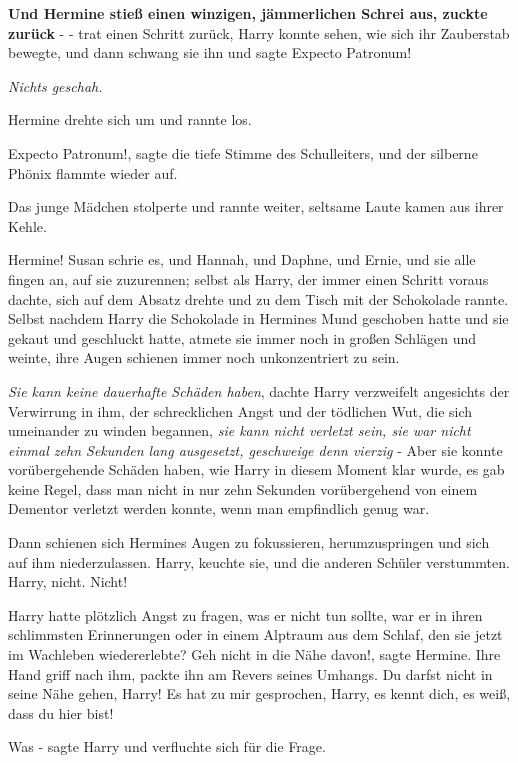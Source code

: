\textbf{ Und Hermine stieß einen winzigen, jämmerlichen Schrei aus, zuckte
zurück} - - trat einen Schritt zurück, Harry konnte sehen, wie sich ihr
Zauberstab bewegte, und dann schwang sie ihn und sagte \glqq{}Expecto Patronum!\grqq{}

\emph{Nichts geschah.}

Hermine drehte sich um und rannte los.

\glqq{}Expecto Patronum!\grqq{}, sagte die tiefe Stimme des Schulleiters, und der
silberne Phönix flammte wieder auf.

Das junge Mädchen stolperte und rannte weiter, seltsame Laute kamen aus ihrer
Kehle.

\glqq{}Hermine!\grqq{} Susan schrie es, und Hannah, und Daphne, und Ernie, und
sie alle fingen an, auf sie zuzurennen; selbst als Harry, der immer einen
Schritt voraus dachte, sich auf dem Absatz drehte und zu dem Tisch mit der
Schokolade rannte. Selbst nachdem Harry die Schokolade in Hermines Mund
geschoben hatte und sie gekaut und geschluckt hatte, atmete sie immer noch in
großen Schlägen und weinte, ihre Augen schienen immer noch unkonzentriert zu
sein.

\emph{Sie kann keine dauerhafte Schäden haben}, dachte Harry verzweifelt
angesichts der Verwirrung in ihm, der schrecklichen Angst und der tödlichen Wut,
die sich umeinander zu winden begannen,\emph{ sie kann nicht verletzt sein, sie
war nicht einmal zehn Sekunden lang ausgesetzt, geschweige denn vierzig} - Aber
sie konnte vorübergehende Schäden haben, wie Harry in diesem Moment klar wurde,
es gab keine Regel, dass man nicht in nur zehn Sekunden vorübergehend von einem
Dementor verletzt werden konnte, wenn man empfindlich genug war.

Dann schienen sich Hermines Augen zu fokussieren, herumzuspringen und sich auf
ihm niederzulassen. \glqq{}Harry\grqq{}, keuchte sie, und die anderen Schüler
verstummten. \glqq{}Harry, nicht. Nicht!\grqq{}

Harry hatte plötzlich Angst zu fragen, was er nicht tun sollte, war er in ihren
schlimmsten Erinnerungen oder in einem Alptraum aus dem Schlaf, den sie jetzt im
Wachleben wiedererlebte? \glqq{}Geh nicht in die Nähe davon!\grqq{}, sagte
Hermine. Ihre Hand griff nach ihm, packte ihn am Revers seines Umhangs. \glqq{}Du
darfst nicht in seine Nähe gehen, Harry! Es hat zu mir gesprochen, Harry, es
kennt dich, es weiß, dass du hier bist!\grqq{}

\glqq{}Was -\grqq{} sagte Harry und verfluchte sich für die Frage.

